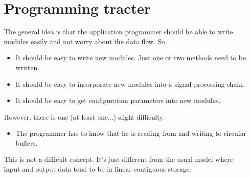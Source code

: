 \section{Programming tracter}

The general idea is that the application programmer should be able to
write modules easily and not worry about the data flow.  So

\begin{itemize}
\item It should be easy to write new modules.  Just one or two methods
  need to be written.
\item It should be easy to incorporate new modules into a signal
  processing chain.
\item It should be easy to get configuration parameters into new
  modules.
\end{itemize}
However, there is one (at least one...) slight difficulty:
\begin{itemize}
\item The programmer has to know that he is reading from and writing
  to circular buffers.
\end{itemize}

This is not a difficult concept.  It's just different from the usual
model where input and output data tend to be in linear contiguous
storage.


